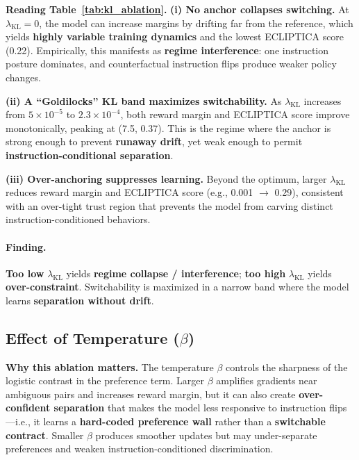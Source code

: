 \vspace{-0.35em}
\noindent\textbf{Reading Table~\ref{tab:kl_ablation}.}
\textbf{(i) No anchor collapses switching.}
At $\lambda_{\text{KL}}=0$, the model can increase margins by drifting far from the reference, which yields \textbf{highly variable training dynamics} and the lowest ECLIPTICA score (0.22).
Empirically, this manifests as \textbf{regime interference}: one instruction posture dominates, and counterfactual instruction flips produce weaker policy changes.

\vspace{-0.25em}
\noindent
\textbf{(ii) A ``Goldilocks'' KL band maximizes switchability.}
As $\lambda_{\text{KL}}$ increases from $5\times 10^{-5}$ to $2.3\times 10^{-4}$, both reward margin and ECLIPTICA score improve monotonically, peaking at (7.5, 0.37).
This is the regime where the anchor is strong enough to prevent \textbf{runaway drift}, yet weak enough to permit \textbf{instruction-conditional separation}.

\vspace{-0.25em}
\noindent
\textbf{(iii) Over-anchoring suppresses learning.}
Beyond the optimum, larger $\lambda_{\text{KL}}$ reduces reward margin and ECLIPTICA score (e.g., 0.001 $\rightarrow$ 0.29), consistent with an over-tight trust region that prevents the model from carving distinct instruction-conditioned behaviors.

\vspace{-0.15em}
\paragraph{\textbf{Finding.}}
\textbf{Too low} $\lambda_{\text{KL}}$ yields \textbf{regime collapse / interference}; \textbf{too high} $\lambda_{\text{KL}}$ yields \textbf{over-constraint}.
Switchability is maximized in a narrow band where the model learns \textbf{separation without drift}.

\subsection{Effect of Temperature ($\beta$)}

\vspace{-0.25em}
\noindent
\textbf{Why this ablation matters.}
The temperature $\beta$ controls the sharpness of the logistic contrast in the preference term.
Larger $\beta$ amplifies gradients near ambiguous pairs and increases reward margin, but it can also create \textbf{over-confident separation} that makes the model less responsive to instruction flips---i.e., it learns a \textbf{hard-coded preference wall} rather than a \textbf{switchable contract}.
Smaller $\beta$ produces smoother updates but may under-separate preferences and weaken instruction-conditioned discrimination.

